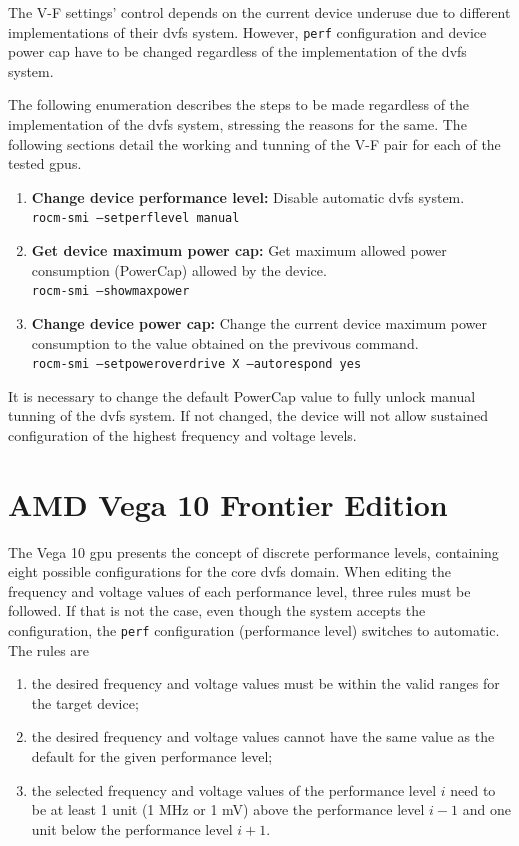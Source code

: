 The V-F settings' control depends on the current device underuse due to different implementations of their \acrshort{dvfs} system. However, \texttt{perf} configuration and device power cap have to be changed regardless of the implementation of the \acrshort{dvfs} system. 

The following enumeration describes the steps to be made regardless of the implementation of the \acrshort{dvfs} system, stressing the reasons for the same. The following sections detail the working and tunning of the V-F pair for each of the tested \acrshort{gpu}s.

\begin{enumerate}
\item \textbf{Change device performance level:} Disable automatic \acrshort{dvfs} system.\\
\texttt{rocm-smi --setperflevel manual}
\item \textbf{Get device maximum power cap:} Get maximum allowed power consumption (PowerCap) allowed by the device. \\
\texttt{rocm-smi --showmaxpower} 
\item \textbf{Change device power cap:} Change the current device maximum power consumption to the value obtained on the previvous command.\\
\texttt{rocm-smi --setpoweroverdrive X --autorespond yes}
\end{enumerate}

It is necessary to change the default PowerCap value to fully unlock manual tunning of the \acrshort{dvfs} system. If not changed, the device will not allow sustained configuration of the highest frequency and voltage levels.

\section{AMD Vega 10 Frontier Edition}

The Vega 10 \acrshort{gpu} presents the concept of discrete performance levels, containing eight possible configurations for the core \acrshort{dvfs} domain. 
When editing the frequency and voltage values of each performance level, three rules must be followed. If that is not the case, even though the system accepts the configuration, the \texttt{perf} configuration (performance level) switches to automatic. The rules are 

\begin{enumerate}
\item the desired frequency and voltage values must be within the valid ranges for the target device; 
\item the desired frequency and voltage values cannot have the same value as the default for the given performance level; 
\item the selected frequency and voltage values of the performance level $i$ need to be at least 1 unit (1 MHz or 1 mV) above the performance level $i-1$ and one unit below the performance level $i+1$.
\end{enumerate}


